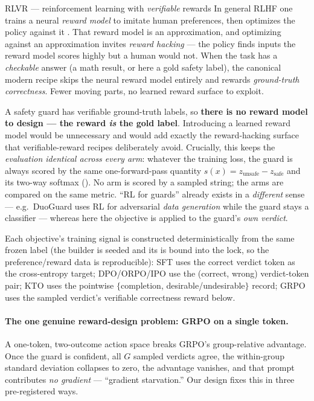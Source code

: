 \begin{background}{RLVR --- reinforcement learning with \emph{verifiable} rewards}
In general RLHF one trains a neural \emph{reward model} to imitate human preferences, then optimizes the
policy against it \citep{ouyang2022instructgpt}. That reward model is an approximation, and optimizing
against an approximation invites \emph{reward hacking} --- the policy finds inputs the reward model scores
highly but a human would not. When the task has a \emph{checkable} answer (a math result, or here a gold
safety label), the canonical modern recipe skips the neural reward model entirely and rewards
\emph{ground-truth correctness}. Fewer moving parts, no learned reward surface to exploit.
\end{background}

A safety guard has verifiable ground-truth labels, so \textbf{there is no reward model to design ---
the reward \emph{is} the gold label}. Introducing a learned reward model would be unnecessary and would
add exactly the reward-hacking surface that verifiable-reward recipes deliberately avoid. Crucially, this
keeps the \emph{evaluation identical across every arm}: whatever the training loss, the guard is always
scored by the same one-forward-pass quantity $s(x)=z_{\text{unsafe}}-z_{\text{safe}}$ and its two-way
softmax (). No arm is scored by a sampled string; the arms are compared on the same
metric. ``RL for guards'' already exists in a \emph{different} sense --- e.g.\ DuoGuard uses RL for
adversarial \emph{data generation} while the guard stays a classifier \citep{deng2025duoguard} --- whereas
here the objective is applied to the guard's \emph{own verdict}.

Each objective's training signal is constructed deterministically from the same frozen label (the builder
is seeded and its  is bound into the lock, so the preference/reward data is
reproducible): SFT uses the correct verdict token as the cross-entropy target; DPO/ORPO/IPO use the
(correct, wrong) verdict-token pair; KTO uses the pointwise $\{$completion, desirable/undesirable$\}$
record; GRPO uses the sampled verdict's verifiable correctness reward below.

\paragraph{The one genuine reward-design problem: GRPO on a single token.} A one-token, two-outcome action
space breaks GRPO's group-relative advantage. Once the guard is confident, all $G$ sampled verdicts agree,
the within-group standard deviation collapses to zero, the advantage vanishes, and that prompt contributes
\emph{no gradient} --- ``gradient starvation.'' Our design fixes this in three pre-registered ways.

